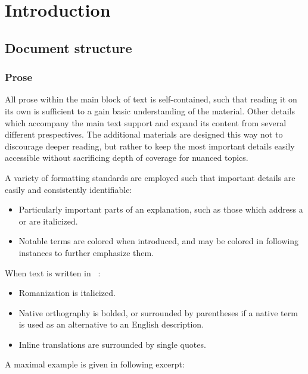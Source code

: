 \chapter{Introduction}
\section{Document structure}
\subsection{Prose}
All prose within the main block of text is self-contained, such that reading it on its own is sufficient to a gain basic understanding of the material.
Other details which accompany the main text support and expand its content from several different prespectives.
The additional materials are designed this way not to discourage deeper reading, but rather to keep the most important details easily accessible without sacrificing depth of coverage for nuanced topics.

A variety of formatting standards are employed such that important details are easily and consistently identifiable:

\begin{itemize}
  \item Particularly important parts of an explanation, such as those which address a  or  are italicized.
  \item Notable terms are colored  when introduced, and may be colored in following instances to further emphasize them.
\end{itemize}

When text is written in \langname\ :

\begin{itemize}
  \item Romanization is italicized.
  \item Native orthography is bolded, or surrounded by parentheses if a native term is used as an alternative to an English description.
  \item Inline translations are surrounded by single quotes.
\end{itemize}

A maximal example is given in following excerpt:

